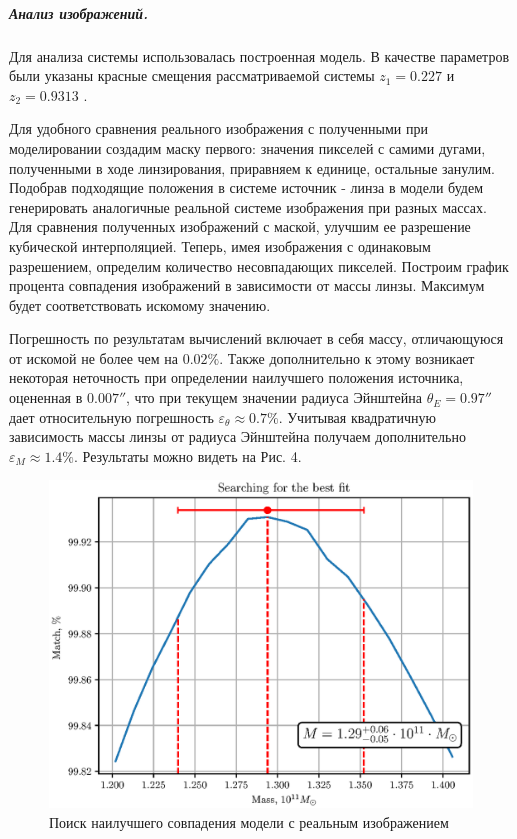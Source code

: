 \documentclass[12pt,a4paper]{article}
\begin{document}
\subparagraph*{Анализ изображений.}
Для анализа системы использовалась построенная модель. 
В качестве параметров были указаны красные смещения рассматриваемой системы $z_1 = 0.227$ и $z_2 = 0.9313$ \cite{redshift0029}.

Для удобного сравнения реального изображения с полученными при моделировании создадим маску первого: значения пикселей с самими дугами, полученными в ходе линзирования, приравняем к единице, остальные занулим.
Подобрав подходящие положения в системе источник - линза в модели будем генерировать аналогичные реальной системе изображения при разных массах. 
Для сравнения полученных изображений с маской, улучшим ее разрешение кубической интерполяцией. 
Теперь, имея изображения с одинаковым разрешением, определим количество несовпадающих пикселей. 
Построим график процента совпадения изображений в зависимости от массы линзы. 
Максимум будет соответствовать искомому значению. 

Погрешность по результатам вычислений включает в себя массу, отличающуюся от искомой не более чем на $0.02\%$.
Также дополнительно к этому возникает некоторая неточность при определении наилучшего положения источника, оцененная в $0.007''$, что при текущем значении радиуса Эйнштейна $\theta_E = 0.97''$ дает относительную погрешность $\varepsilon_{\theta} \approx 0.7\%$.
Учитывая квадратичную зависимость массы линзы от радиуса Эйнштейна получаем дополнительно $\varepsilon_M \approx 1.4\%$.
Результаты можно видеть на Рис. 4.
\begin{figure}[h]
    \centering
    \includegraphics[width=0.8\linewidth]{sources/resultMass.eps}
    \caption{\small Поиск наилучшего совпадения модели с реальным изображением}
\end{figure}
\end{document}
